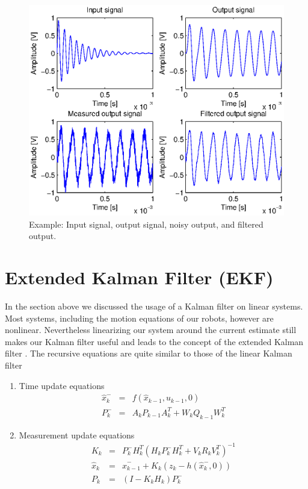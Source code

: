 \begin{figure}[htbp]
	\centering
    	\includegraphics[width=12cm]{./3_KalmanFilterTheory/KFchart.eps}
  	\caption{Example: Input signal, output signal, noisy output, and filtered output.}
  	\label{KFchart}
\end{figure}

\section{Extended Kalman Filter (EKF)}

In the section above we discussed the usage of a Kalman filter on linear systems. Most systems, including the motion equations of our robots, however are nonlinear. Nevertheless linearizing our system around the current estimate still makes our Kalman filter useful and leads to the concept of the extended Kalman filter \cite{IntroKF}. The recursive equations are quite similar to those of the linear Kalman filter
\newline
\begin{enumerate}
	\item Time update equations
	\begin{eqnarray}\label{TupEqEKF}
    			\hat{x}_{k}^- &=& f(\hat{x}_{k-1},u_{k-1},0) \\
    			P_{k}^{-} &=& A_kP_{k-1}A_k^T+W_k Q_{k-1} W_k^T
	\end{eqnarray}
	\item Measurement update equations
	\begin{eqnarray}\label{MupEqEKF}
    			K_{k} &=& P_{k}^- H_k^T(H_k P_k^- H_k^T+V_k R_k V_k^T)^{-1} \\
    			\hat{x}_k &=& \hat{x}_{k-1}^- + K_{k}(z_k - h(\hat{x}_k^-, 0)) \\
			P_k &=& (I-K_k H_k)P_k^-
	\end{eqnarray}
\end{enumerate}

